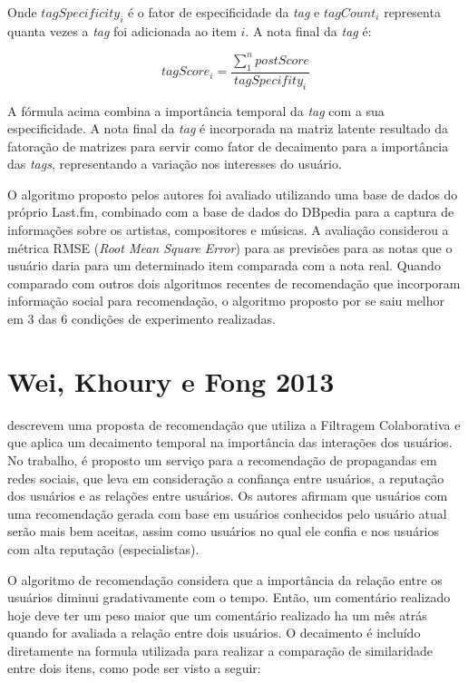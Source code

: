 Onde $tagSpecificity_i$ é o fator de especificidade da \textit{tag} e $tagCount_i$ representa quanta vezes a \textit{tag} foi adicionada
ao item $i$. A nota final da \textit{tag} é:

\begin{equation}
  tagScore_i = \frac{\sum_1^n{postScore}}{tagSpecifity_i}
  \label{eq:kushwaha-nota-final}
\end{equation}

A fórmula acima combina a importância temporal da \textit{tag} com a sua especificidade. A nota final da \textit{tag}
é incorporada na matriz latente resultado da fatoração de matrizes para servir como fator de decaimento para a importância
das \textit{tags}, representando a variação nos interesses do usuário.

O algoritmo proposto pelos autores foi avaliado utilizando uma base de dados do próprio Last.fm, combinado com a base de
dados do DBpedia para a captura de informações sobre os artistas, compositores e músicas. A avaliação considerou a
métrica RMSE (\textit{Root Mean Square Error}) para as previsões para as notas que o usuário daria para um determinado
item comparada com a nota real. Quando comparado com outros dois algoritmos recentes de recomendação que incorporam
informação social para recomendação, o algoritmo proposto por  se saiu melhor em 3
das 6 condições de experimento realizadas.

\section{Wei, Khoury e Fong 2013}

 descrevem uma proposta de recomendação que utiliza a Filtragem Colaborativa e que aplica um
decaimento temporal na importância das interações dos usuários. No trabalho, é proposto um serviço para a recomendação
de propagandas em redes sociais, que leva em consideração a confiança entre usuários, a reputação dos usuários e as
relações entre usuários. Os autores afirmam que usuários com uma recomendação gerada com base em usuários conhecidos
pelo usuário atual serão mais bem aceitas, assim como usuários no qual ele confia e nos usuários com alta reputação
(especialistas).

O algoritmo de recomendação considera que a importância da relação entre os usuários diminui gradativamente com o tempo.
Então, um comentário realizado hoje deve ter um peso maior que um comentário realizado ha um mês atrás quando for
avaliada a relação entre dois usuários. O decaimento é incluído diretamente na formula utilizada para realizar a
comparação de similaridade entre dois itens, como pode ser visto a seguir:

